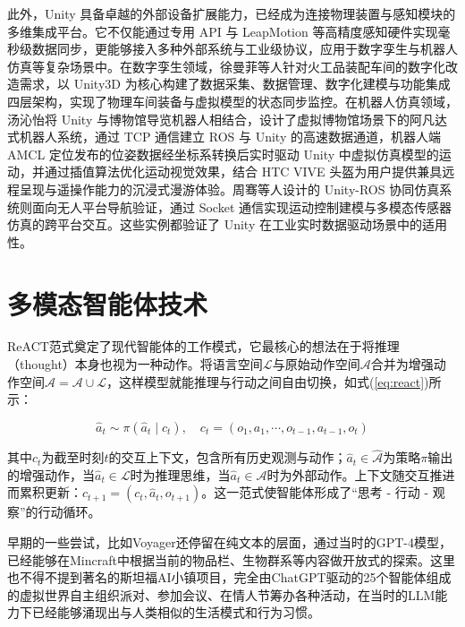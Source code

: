 \documentclass[bachelor]{njupthesis}
\begin{document}
此外，Unity 具备卓越的外部设备扩展能力，已经成为连接物理装置与感知模块的多维集成平台。它不仅能通过专用 API 与 LeapMotion 等高精度感知硬件实现毫秒级数据同步，更能够接入多种外部系统与工业级协议，应用于数字孪生与机器人仿真等复杂场景中。在数字孪生领域，徐曼菲等人针对火工品装配车间的数字化改造需求，以 Unity3D 为核心构建了数据采集、数据管理、数字化建模与功能集成四层架构，实现了物理车间装备与虚拟模型的状态同步监控。在机器人仿真领域，汤沁怡将 Unity 与博物馆导览机器人相结合，设计了虚拟博物馆场景下的阿凡达式机器人系统，通过 TCP 通信建立 ROS 与 Unity 的高速数据通道，机器人端 AMCL 定位发布的位姿数据经坐标系转换后实时驱动 Unity 中虚拟仿真模型的运动，并通过插值算法优化运动视觉效果，结合 HTC VIVE 头盔为用户提供兼具远程呈现与遥操作能力的沉浸式漫游体验。周骞等人设计的 Unity-ROS 协同仿真系统则面向无人平台导航验证，通过 Socket 通信实现运动控制建模与多模态传感器仿真的跨平台交互。这些实例都验证了 Unity 在工业实时数据驱动场景中的适用性。

\section{多模态智能体技术}

ReACT范式奠定了现代智能体的工作模式，它最核心的想法在于将推理（thought）本身也视为一种动作。将语言空间$\mathcal{L}$与原始动作空间$\mathcal{A}$合并为增强动作空间$\hat{\mathcal{A}} = \mathcal{A} \cup \mathcal{L}$，这样模型就能推理与行动之间自由切换，如式(\ref{eq:react})所示：

\begin{equation}
\hat{a}_t \sim \pi(\hat{a}_t \mid c_t), \quad c_t = (o_1, a_1, \cdots, o_{t-1}, a_{t-1}, o_t)
\label{eq:react}
\end{equation}

其中$c_t$为截至时刻$t$的交互上下文，包含所有历史观测与动作；$\hat{a}_t \in \hat{\mathcal{A}}$为策略$\pi$输出的增强动作，当$\hat{a}_t \in \mathcal{L}$时为推理思维，当$\hat{a}_t \in \mathcal{A}$时为外部动作。上下文随交互推进而累积更新：$c_{t+1} = (c_t, \hat{a}_t, o_{t+1})$。这一范式使智能体形成了“思考 - 行动 - 观察”的行动循环。

早期的一些尝试，比如Voyager还停留在纯文本的层面，通过当时的GPT-4模型，已经能够在Mincraft中根据当前的物品栏、生物群系等内容做开放式的探索。这里也不得不提到著名的斯坦福AI小镇项目，完全由ChatGPT驱动的25个智能体组成的虚拟世界自主组织派对、参加会议、在情人节筹办各种活动，在当时的LLM能力下已经能够涌现出与人类相似的生活模式和行为习惯。
\end{document}
